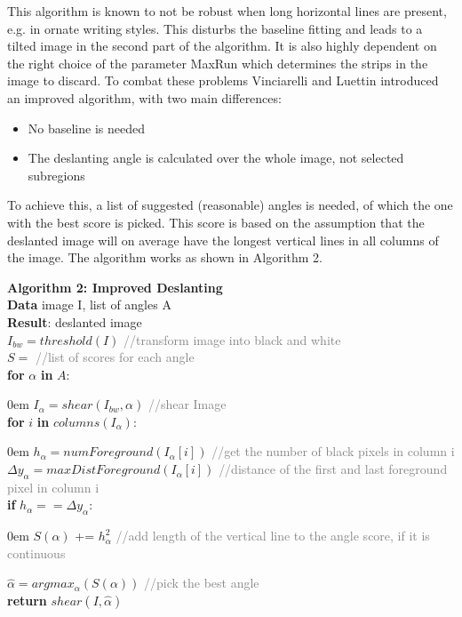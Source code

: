 \documentclass{article}
\begin{document}
This algorithm is known to not be robust when long horizontal lines are present, e.g. in ornate writing styles. This disturbs the baseline fitting and leads to a tilted image in the second part of the algorithm. It is also highly dependent on the right choice of the parameter MaxRun which determines the strips in the image to discard.
To combat these problems Vinciarelli and Luettin \cite{Vinciarelli} introduced an improved algorithm, with two main differences:
\begin{itemize}
\item No baseline is needed
\item The deslanting angle is calculated over the whole image, not selected subregions
\end{itemize}
To achieve this, a list of suggested (reasonable) angles is needed, of which the one with the best score is picked. This score is based on the assumption that the deslanted image will on average have the longest vertical lines in all columns of the image.
The algorithm works as shown in Algorithm 2.

\begin{algorithm}	
\textbf{Algorithm 2: Improved Deslanting} \\
\textbf{Data} image I, list of angles A \\
\textbf{Result}: deslanted image \\
$I_{bw} = threshold(I)$ \textcolor{gray}{//transform image into black and white} \\
$S = {}$ \textcolor{gray}{//list of scores for each angle} \\
\textbf{for} $\alpha$ \textbf{in} $A$:
\begin{addmargin}[1em] {0em}%
$I_{\alpha} = shear(I_{bw}, \alpha)$ \textcolor{gray}{//shear Image} \\
\textbf{for} $i$ \textbf{in} $columns(I_{\alpha})$:
\begin{addmargin}[1em] {0em}%
$h_{\alpha} = numForeground(I_{\alpha}[i])$ \textcolor{gray}{//get the number of black pixels in column i} \\
$\Delta y_{\alpha} = maxDistForeground(I_{\alpha}[i])$ \textcolor{gray}{//distance of the first and last foreground pixel in column i} \\
\textbf{if} $h_{\alpha} == \Delta y_{\alpha}$:
\begin{addmargin}[1em] {0em}%
$S(\alpha)$ += $h_{\alpha}^2$ \textcolor{gray}{//add length of the vertical line to the angle score, if it is continuous}
\end{addmargin}
\end{addmargin}
\end{addmargin}
$\hat{\alpha} = argmax_{\alpha}(S(\alpha))$ \textcolor{gray}{//pick the best angle} \\
\textbf{return} $shear(I, \hat{\alpha})$  
\end{algorithm}
\end{document}
